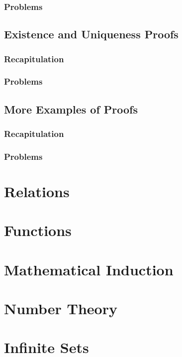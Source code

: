 \documentclass{report}
\begin{document}
        \subsection{Problems}
    \section{Existence and Uniqueness Proofs}
        \subsection{Recapitulation}
        \subsection{Problems}
    \section{More Examples of Proofs}
        \subsection{Recapitulation}
        \subsection{Problems}

\chapter{Relations}

\chapter{Functions}

\chapter{Mathematical Induction}

\chapter{Number Theory}

\chapter{Infinite Sets}
\end{document}
